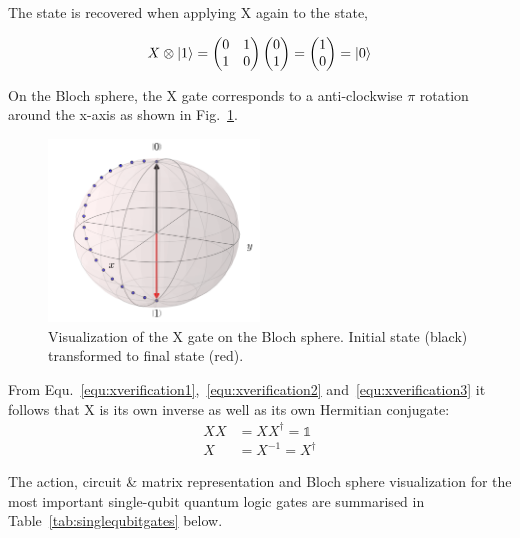 The \0 state is recovered when applying X again to the \1 state,

\begin{equation}
\label{equ:xverification3}
X \otimes \ket{1} = \begin{pmatrix}
 0 & 1 \\ 
 1 & 0
 \end{pmatrix} \begin{pmatrix}
 0  \\ 
 1
 \end{pmatrix} = \begin{pmatrix}
 1  \\ 
 0 \end{pmatrix} =  \ket{0}
\end{equation}

On the Bloch sphere, the X gate corresponds to a anti-clockwise $\pi$ rotation around the x-axis as shown in Fig.~\ref{img:blochxgate}.

\begin{figure}[ht]
   \centering
   \includegraphics[width=0.5\textwidth]{img/blochxgate.png}
   \caption{Visualization of the X gate on the Bloch sphere. Initial state (black) transformed to final state (red).}
   \label{img:blochxgate}
\end{figure}

From Equ.~\ref{equ:xverification1},~\ref{equ:xverification2} and~\ref{equ:xverification3} it follows that X is its own inverse as well as its own Hermitian conjugate:
\begin{align}
XX &= XX^\dagger = \mathbb{1} \\
X &= X^{-1} = X^\dagger
\end{align}

The action, circuit \& matrix representation and Bloch sphere visualization for the most important single-qubit quantum logic gates are summarised in Table~\ref{tab:singlequbitgates}  below.

